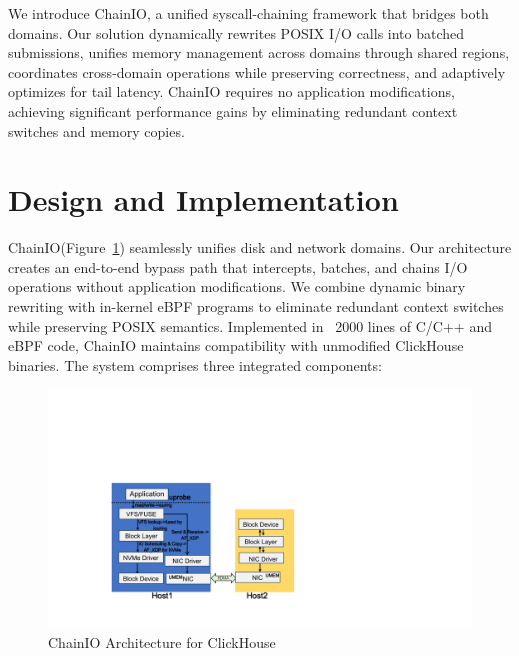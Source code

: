 \documentclass[sigconf,10pt]{acmart}
\newcommand{\sys}{ChainIO\xspace}
\begin{document}
We introduce \sys, a unified syscall-chaining framework that bridges both domains. Our solution dynamically rewrites POSIX I/O calls into batched submissions, unifies memory management across domains through shared regions, coordinates cross-domain operations while preserving correctness, and adaptively optimizes for tail latency. \sys requires no application modifications, achieving significant performance gains by eliminating redundant context switches and memory copies.

\section{Design and Implementation}\label{sec:design-impl}

\sys (Figure~\ref{fig:bur}) seamlessly unifies disk and network domains. Our architecture creates an end-to-end bypass path that intercepts, batches, and chains I/O operations without application modifications. We combine dynamic binary rewriting with in-kernel eBPF programs to eliminate redundant context switches while preserving POSIX semantics. Implemented in ~2000 lines of C/C++ and eBPF code, \sys maintains compatibility with unmodified ClickHouse binaries. The system comprises three integrated components:

\begin{figure}[h]
\centering
\includegraphics[width=\columnwidth]{img/bur.pdf}
\caption{\sys Architecture for ClickHouse}\label{fig:bur}
\end{figure}
\end{document}
